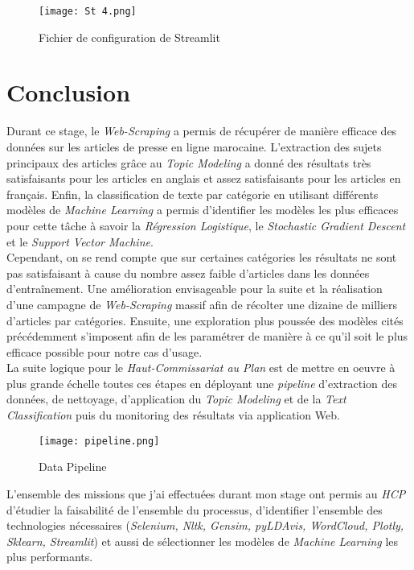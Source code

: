 \documentclass[a4paper,french,12pt]{article}
\begin{document}
\begin{figure}[!h]
    \centering
    \texttt{[image: St 4.png]}
    \caption{Fichier de configuration de Streamlit}
\end{figure}

\newpage

\section{Conclusion}
\label{sec:Conclusion}

Durant ce stage, le \emph{Web-Scraping} a permis de récupérer de manière efficace des données sur les articles de presse en ligne marocaine. L'extraction des sujets principaux des articles grâce au \emph{Topic Modeling} a donné des résultats très satisfaisants pour les articles en anglais et assez satisfaisants pour les articles en français. Enfin, la classification de texte par catégorie en utilisant différents modèles de \emph{Machine Learning} a permis d'identifier les modèles les plus efficaces pour cette tâche à savoir la \emph{Régression Logistique}, le \emph{Stochastic Gradient Descent} et le \emph{Support Vector Machine}.\\

Cependant, on se rend compte que sur certaines catégories les résultats ne sont pas satisfaisant à cause du nombre assez faible d'articles dans les données d'entraînement. Une amélioration envisageable pour la suite et la réalisation d'une campagne de \emph{Web-Scraping} massif afin de récolter une dizaine de milliers d'articles par catégories. Ensuite, une exploration plus poussée des modèles cités précédemment s'imposent afin de les paramétrer de manière à ce qu'il soit le plus efficace possible pour notre cas d'usage.\\

La suite logique pour le \emph{Haut-Commissariat au Plan} est de mettre en oeuvre à plus grande échelle toutes ces étapes en déployant une \emph{pipeline} d'extraction des données, de nettoyage, d'application du \emph{Topic Modeling} et de la \emph{Text Classification} puis du monitoring des résultats via application Web.

\begin{figure}[!h]
    \centering
    \texttt{[image: pipeline.png]}
    \caption{Data Pipeline}
\end{figure}

L'ensemble des missions que j'ai effectuées durant mon stage ont permis au  \emph{HCP} d'étudier la faisabilité de l'ensemble du processus, d'identifier l'ensemble des technologies nécessaires (\emph{Selenium, Nltk, Gensim, pyLDAvis, WordCloud, Plotly, Sklearn, Streamlit}) et aussi de sélectionner les modèles de \emph{Machine Learning} les plus performants.\\
\end{document}
